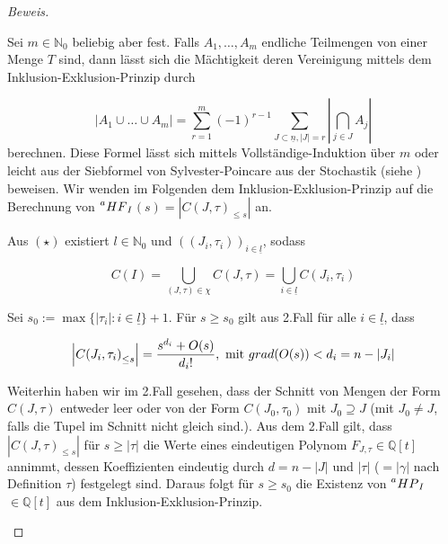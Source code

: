 \documentclass{article}
\newcommand*{\indx}[2]{{#1}_{#2}}
\newcommand*{\N}{\mathbb{N}_0}
\newcommand*{\hf}[1]{$\prescript{a}{}{HF}_{#1}$}
\newcommand*{\hp}[1]{$\prescript{a}{}{HP}_{#1}$}
\begin{document}
\begin{proof}[Beweis]
\begin{compactenum}
		\item Sei $m\in\N$ beliebig aber fest. Falls $\indx{A}{1},\ldots,\indx{A}{m}$ endliche Teilmengen von einer Menge $T$ sind, dann lässt sich die Mächtigkeit deren Vereinigung mittels dem Inklusion-Exklusion-Prinzip durch
		
		\begin{displaymath}
		\left|\indx{A}{1}\cup\ldots\cup\indx{A}{m}\right|=\sum\limits_{r=1}^{m}(-1)^{r-1}\sum\limits_{J\subset\underline{n},\left|J\right|=r}{|\bigcap\limits_{j\in J}\indx{A}{j}|}
		\end{displaymath}
		berechnen. Diese Formel lässt sich mittels Vollständige-Induktion über $m$ oder leicht aus der Siebformel von Sylvester-Poincare aus der Stochastik (siehe \cite{Kamps17}) beweisen. Wir wenden im Folgenden dem Inklusion-Exklusion-Prinzip auf die Berechnung von \hf{I}$(s)=\left|\indx{C(J,\tau)}{\leq s}\right|$ an.
		
		Aus $(\star)$ existiert $l\in\N$ und $\indx{\left((\indx{J}{i},\indx{\tau}{i})\right)}{i\in\underline{l}}$, sodass
		
		\begin{displaymath}
		C(I)=\bigcup\limits_{(J,\tau)\in \chi}C(J,\tau)=\bigcup\limits_{i\in\underline{l}}C(\indx{J}{i},\indx{\tau}{i})
		\end{displaymath}
		
		Sei $\indx{s}{0}:=\max{\{|\indx{\tau}{i}|:i\in\underline{l}\}}+1$. Für $s\geq \indx{s}{0}$ gilt  aus 2.Fall für alle $i\in \underline{l}$, dass
		
		\begin{displaymath}
		\left|\indx{C(\indx{J}{i},\indx{\tau}{i})}{\leq s}\right|=\frac{s^{\indx{d}{i}}+O(s)}{\indx{d}{i}!}, \textnormal{ mit }grad(O(s))<{\indx{d}{i}}=n-|\indx{J}{i}|
		\end{displaymath}
		
		Weiterhin haben wir im 2.Fall gesehen, dass der Schnitt von Mengen der Form $C(J,\tau)$ entweder leer oder von der Form $C(\indx{J}{0},\indx{\tau}{0})$ mit $\indx{J}{0}\supseteq J$ (mit $\indx{J}{0}\neq J$, falls die Tupel im Schnitt nicht gleich sind.). Aus dem 2.Fall gilt, dass $\left|\indx{C(J,\tau)}{\leq s}\right|$ für $s\geq |\tau|$ die Werte eines eindeutigen Polynom $\indx{F}{J,\tau}\in \mathbb{Q}[t]$ annimmt, dessen Koeffizienten eindeutig durch $d=n-|J|$ und $|\tau|$ ($=|\gamma| $ nach Definition $\tau$) festgelegt sind. Daraus folgt für $s\geq\indx{s}{0}$ die Existenz von \hp{I} $\in \mathbb{Q}[t]$ aus dem Inklusion-Exklusion-Prinzip.
		

\end{compactenum}
\end{proof}
\end{document}
